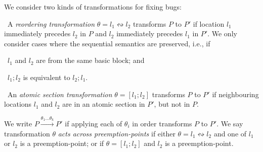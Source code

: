 \documentclass{llncs}
\newcommand\new{\color{red}}
\newcommand\comment[1]{}
\newcommand\Prog{\ensuremath{\mathit{P}}}
\newcommand\PProg{\ensuremath{\mathcal{P}}}
\newcommand\SemPreGen[1]{\ensuremath{\mathit{SemPreGen}(#1)}}
\newcommand\switch[2]{#1 \ensuremath{\leftrightsquigarrow} #2}
\newcommand\reorder{\theta}
\begin{document}
\comment{
\paragraph{Generalizing a program to a partial-program.}
Given a program $\Prog$, we define the preemption-free
semantics-preserving partial-program $\PProg = \SemPreGen{\Prog}$.
The procedure to compute $\SemPreGen{\Prog}$ is a generalization of the
procedure described in~\cite{cav2013}.
Intuitively, the procedure works as follows: 
\begin{compactitem}
\item The procedure iteratively picks neighbouring statements (say
  $A$ and $B$) and checks for a variable valuation such
  that executing $A; B$ results in a different result from executing $B; A$.
  If not, $A$ and $B$ are added to a {\tt reorder} block.
\item The procedure then inserts the largest {\tt atomize} blocks which
  do not contain any {\new {\tt await} statements}.
\end{compactitem}
}

We consider two kinds of transformations for fixing bugs:
\begin{compactitem}
\item~A {\em reordering transformation} $\reorder = \switch{l_1}{l_2}$
  transforms $\Prog$ to $\Prog'$ if location $l_1$ immediately precedes
  $l_2$ in $\Prog$ and $l_2$ immediately precedes $l_1$ in
  $\Prog'$.
  We only consider cases where the sequential semantics
  are preserved, i.e., if
\begin{inparaenum}[(a)]
  \item~$l_1$ and $l_2$ are from the same basic block; and
  \item~$l_1; l_2$ is equivalent to $l_2; l_1$.
  \end{inparaenum}
\item~An {\em atomic section transformation} $\reorder = [l_1;l_2]$
  transforms $\Prog$ to $\Prog'$ if 
neighbouring locations $l_1$ and $l_2$ are in an atomic
  section in $\Prog'$, but not in $\Prog$.
\end{compactitem}
We write
$\Prog\xrightarrow{\reorder_1\ldots \reorder_k}\Prog'$ if applying each
of $\reorder_i$ in order transforms $\Prog$ to $\Prog'$.
We say transformation $\reorder$ {\em
acts across preemption-points} if either $\reorder = \switch{l_1}{l_2}$
and one of $l_1$ or $l_2$ is a preemption-point; or if $\reorder = [l_1;
l_2]$ and $l_2$ is a preemption-point.
\end{document}
